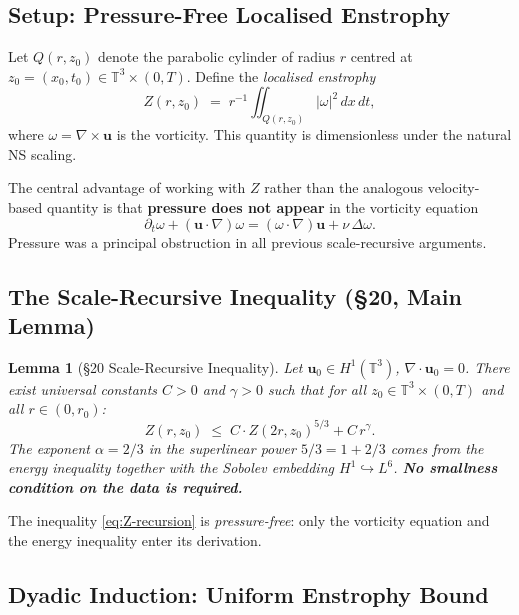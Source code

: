 \documentclass[11pt, a4paper]{article}
\newtheorem{lemma}[theorem]{Lemma}
\theoremstyle{definition}
\theoremstyle{remark}
\begin{document}
\subsection{Setup: Pressure-Free Localised Enstrophy}

Let $Q(r,z_0)$ denote the parabolic cylinder of radius $r$ centred at
$z_0 = (x_0,t_0) \in \mathbb{T}^3\times(0,T)$.
Define the \emph{localised enstrophy}
\begin{equation}
  Z(r, z_0) \;=\; r^{-1} \iint_{Q(r,z_0)} |\omega|^2\,dx\,dt,
  \label{eq:Z-def}
\end{equation}
where $\omega = \nabla\times\mathbf{u}$ is the vorticity.
This quantity is dimensionless under the natural NS scaling.

The central advantage of working with $Z$ rather than the analogous
velocity-based quantity is that \textbf{pressure does not appear} in the
vorticity equation
\[
  \partial_t\omega + (\mathbf{u}\cdot\nabla)\omega
    = (\omega\cdot\nabla)\mathbf{u} + \nu\,\Delta\omega.
\]
Pressure was a principal obstruction in all previous scale-recursive arguments.

\subsection{The Scale-Recursive Inequality (\S20, Main Lemma)}

\begin{lemma}[\S20 Scale-Recursive Inequality]
\label{lem:s20-main}
Let $\mathbf{u}_0 \in H^1(\mathbb{T}^3)$, $\nabla\cdot\mathbf{u}_0 = 0$.
There exist universal constants $C > 0$ and $\gamma > 0$ such that for all
$z_0 \in \mathbb{T}^3\times(0,T)$ and all $r \in (0, r_0)$:
\begin{equation}
  Z(r,z_0) \;\leq\; C\cdot Z(2r,z_0)^{5/3} + C\,r^{\gamma}.
  \label{eq:Z-recursion}
\end{equation}
The exponent $\alpha = 2/3$ in the superlinear power $5/3 = 1 + 2/3$
comes from the energy inequality together with the Sobolev embedding $H^1\hookrightarrow L^6$.
\textbf{No smallness condition on the data is required.}
\end{lemma}

The inequality \eqref{eq:Z-recursion} is \emph{pressure-free}: only the
vorticity equation and the energy inequality enter its derivation.

\subsection{Dyadic Induction: Uniform Enstrophy Bound}
\end{document}
